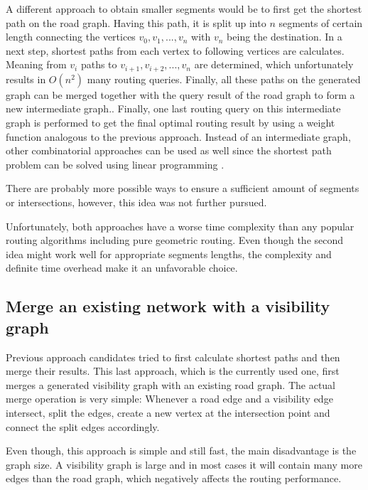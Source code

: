 		A different approach to obtain smaller segments would be to first get the shortest path on the road graph.
		Having this path, it is split up into $n$ segments of certain length connecting the vertices $v_0, v_1, ..., v_n$ with $v_n$ being the destination.
		In a next step, shortest paths from each vertex to following vertices are calculates.
		Meaning from $v_i$ paths to $v_{i+1}, v_{i+2}, ..., v_n$ are determined, which unfortunately results in $O(n^2)$ many routing queries.
		Finally, all these paths on the generated graph can be merged together with the query result of the road graph to form a new intermediate graph..
		Finally, one last routing query on this intermediate graph is performed to get the final optimal routing result by using a weight function analogous to the previous approach.
		Instead of an intermediate graph, other combinatorial approaches can be used as well since the shortest path problem can be solved using linear programming \cite{handler-zang-lp-duality}.
		
		There are probably more possible ways to ensure a sufficient amount of segments or intersections, however, this idea was not further pursued.
		
		Unfortunately, both approaches have a worse time complexity than any popular routing algorithms including pure geometric routing.
		Even though the second idea might work well for appropriate segments lengths, the complexity and definite time overhead make it an unfavorable choice.
	
	\subsection{Merge an existing network with a visibility graph}
	
		Previous approach candidates tried to first calculate shortest paths and then merge their results.
		This last approach, which is the currently used one, first merges a generated visibility graph with an existing road graph.
		The actual merge operation is very simple:
		Whenever a road edge and a visibility edge intersect, split the edges, create a new vertex at the intersection point and connect the split edges accordingly.
		
		Even though, this approach is simple and still fast, the main disadvantage is the graph size.
		A visibility graph is large and in most cases it will contain many more edges than the road graph, which negatively affects the routing performance.
		
